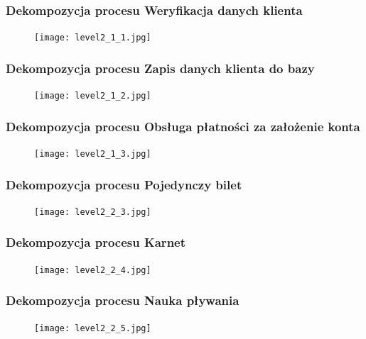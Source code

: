 \documentclass[a4paper,11pt]{article}
\begin{document}
\subsubsection{Dekompozycja procesu Weryfikacja danych klienta}
    \begin{figure}[!htb]
    \centerline{\texttt{[image: level2\_1\_1.jpg]}}
    \label{fig:level2_1_1}
    \end{figure}
    \newpage
    
\subsubsection{Dekompozycja procesu Zapis danych klienta do bazy}
    \begin{figure}[!htb]
    \centerline{\texttt{[image: level2\_1\_2.jpg]}}
    \label{fig:level2_1_2}
    \end{figure}
    \newpage
    
\subsubsection{Dekompozycja procesu Obsługa płatności za założenie konta}
    \begin{figure}[!htb]
    \centerline{\texttt{[image: level2\_1\_3.jpg]}}
    \label{fig:level2_1_3}
    \end{figure}
    \newpage
    
\subsubsection{Dekompozycja procesu Pojedynczy bilet}
    \begin{figure}[!htb]
    \centerline{\texttt{[image: level2\_2\_3.jpg]}}
    \label{fig:level2_2_3}
    \end{figure}
    \newpage
    
\subsubsection{Dekompozycja procesu Karnet}
    \begin{figure}[!htb]
    \centerline{\texttt{[image: level2\_2\_4.jpg]}}
    \label{fig:level2_2_4}
    \end{figure}
    \newpage
    
\subsubsection{Dekompozycja procesu Nauka pływania}
    \begin{figure}[!htb]
    \centerline{\texttt{[image: level2\_2\_5.jpg]}}
    \label{fig:level2_2_5}
    \end{figure}
    \newpage
    
\end{document}
